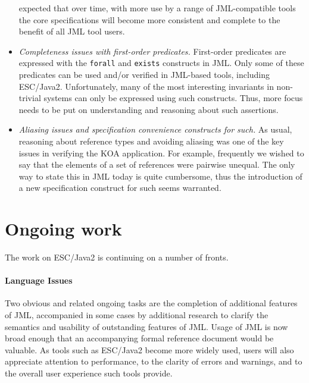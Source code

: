 \documentclass{llncs}
\begin{document}
\begin{itemize}
  expected that over time, with more use by a range of JML-compatible
  tools the core specifications will become more consistent and
  complete to the benefit of all JML tool users.
\item \emph{Completeness issues with first-order predicates.}
  First-order predicates are expressed with the \texttt{forall} and
  \texttt{exists} constructs in JML.  Only some of these predicates
  can be used and/or verified in JML-based tools, including ESC/Java2.
  Unfortunately, many of the most interesting invariants in
  non-trivial systems can only be expressed using such constructs.
  Thus, more focus needs to be put on understanding and reasoning
  about such assertions.
\item \emph{Aliasing issues and specification convenience constructs
    for such.}  As usual, reasoning about reference types and avoiding
  aliasing was one of the key issues in verifying the KOA application.
  For example, frequently we wished to say that the elements of a set of references
 were pairwise unequal.  The only way to
  state this in JML today is quite cumbersome, thus the introduction
  of a new specification construct for such seems warranted.
\end{itemize}


\section{Ongoing work}
The work on ESC/Java2 is continuing on a number of fronts.

\paragraph*{Language Issues} Two obvious and related ongoing tasks are
the completion of additional features of JML, accompanied in some
cases by additional research to clarify the semantics and usability of
outstanding features of JML.  Usage of JML is now broad enough that an
accompanying formal reference document would be valuable.  As
tools such as ESC/Java2 become more widely used, users will also
appreciate attention to performance, to the clarity of errors and
warnings, and to the overall user experience such tools provide.
\end{document}
